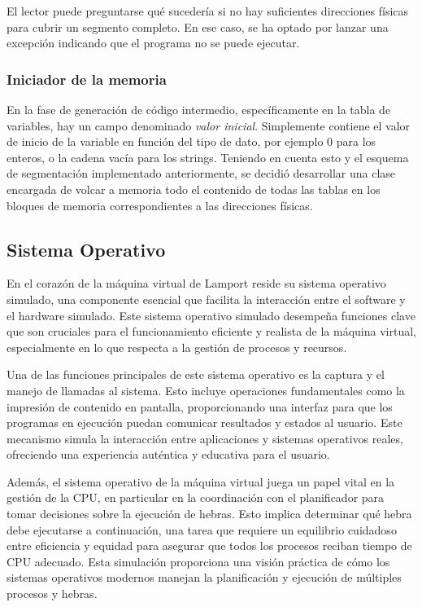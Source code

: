 El lector puede preguntarse qué sucedería si no hay suficientes direcciones físicas para cubrir un segmento completo. En ese caso, se ha optado por lanzar una excepción indicando que el programa no se puede ejecutar.

\subsubsection{Iniciador de la memoria}
En la fase de generación de código intermedio, específicamente en la tabla de variables, hay un campo denominado \textit{valor inicial}. Simplemente contiene el valor de inicio de la variable en función del tipo de dato, por ejemplo 0 para los enteros, o la cadena vacía para los strings. Teniendo en cuenta esto y el esquema de segmentación implementado anteriormente, se decidió desarrollar una clase encargada de volcar a memoria todo el contenido de todas las tablas en los bloques de memoria correspondientes a las direcciones físicas.

\subsection{Sistema Operativo}\label{subsec:SOLVM}
En el corazón de la máquina virtual de Lamport reside su sistema operativo simulado, una componente esencial que facilita la interacción entre el software y el hardware simulado. Este sistema operativo simulado desempeña funciones clave que son cruciales para el funcionamiento eficiente y realista de la máquina virtual, especialmente en lo que respecta a la gestión de procesos y recursos.

Una de las funciones principales de este sistema operativo es la captura y el manejo de llamadas al sistema. Esto incluye operaciones fundamentales como la impresión de contenido en pantalla, proporcionando una interfaz para que los programas en ejecución puedan comunicar resultados y estados al usuario. Este mecanismo simula la interacción entre aplicaciones y sistemas operativos reales, ofreciendo una experiencia auténtica y educativa para el usuario.

Además, el sistema operativo de la máquina virtual juega un papel vital en la gestión de la CPU, en particular en la coordinación con el planificador para tomar decisiones sobre la ejecución de hebras. Esto implica determinar qué hebra debe ejecutarse a continuación, una tarea que requiere un equilibrio cuidadoso entre eficiencia y equidad para asegurar que todos los procesos reciban tiempo de CPU adecuado. Esta simulación proporciona una visión práctica de cómo los sistemas operativos modernos manejan la planificación y ejecución de múltiples procesos y hebras.


